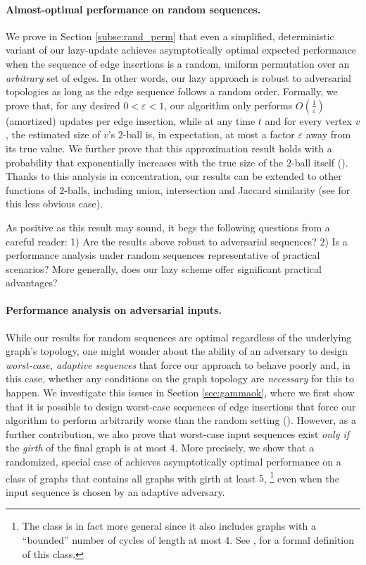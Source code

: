 \paragraph{Almost-optimal performance on random sequences.} We prove in Section \ref{subse:rand_perm} that even a simplified, deterministic variant of our lazy-update  achieves asymptotically optimal expected performance when the  sequence of edge insertions is a random, uniform permutation over an \textit{arbitrary} set of edges. In other words, our lazy approach is robust to adversarial topologies as long as the edge sequence follows a random order.
Formally, we prove that, for any desired $0 < \varepsilon < 1$, our algorithm only performs $O(\frac{1}{\varepsilon})$ (amortized) updates per edge insertion, while at any time $t$ and for every vertex $v$, the estimated size of $v$'s $2$-ball is, in expectation,  at most a factor $\varepsilon$ away from its true value. We further prove that this approximation result holds with a probability that exponentially increases with the true size of the $2$-ball itself (). 
Thanks to this analysis in concentration,  our results can be extended to other functions of $2$-balls, including union, intersection and Jaccard similarity (see  for this less obvious case). 

As positive as this result may sound, it begs the following questions from a careful reader: 1) Are the results above robust to adversarial sequences? 2) Is a performance analysis under random sequences representative of practical scenarios? More generally, does our lazy scheme offer significant practical advantages?

\paragraph{Performance analysis on adversarial inputs.} While our results for random sequences are optimal regardless of the underlying graph's topology, one might wonder about the ability of an adversary to design \textit{worst-case, adaptive sequences} that force our approach to behave poorly and, in this case, whether any conditions on the graph topology are \textit{necessary} for this to happen. We investigate this issues in Section \ref{sec:gammaok}, where we first show that it is possible to design  worst-case sequences of edge insertions that force our algorithm to perform arbitrarily worse than the random setting ().  However, as a further contribution, we also prove that worst-case input sequences exist \textit{only if} the \textit{girth}  \cite{diestel2024graph} of the final graph is at most $4$.
More precisely, we show that a randomized, special case of  achieves asymptotically optimal performance on a class of graphs that contains all graphs with girth at least $5$, \footnote{The  class is in fact more general since it also includes graphs with  a ``bounded'' number of cycles of length at most 4. See , for a formal definition of this class.} even when the input sequence is chosen by an adaptive adversary. 


